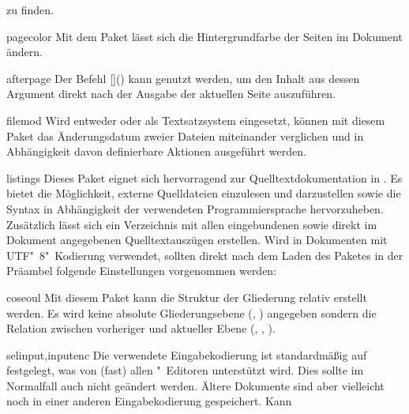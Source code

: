 \begin{packages}
  zu finden.
\item[pagecolor]
  Mit dem Paket lässt sich die Hintergrundfarbe der Seiten im Dokument ändern.
\item[afterpage]
  Der Befehl [\MPValue{\dots}]() kann 
  genutzt werden, um den Inhalt aus dessen Argument direkt nach der Ausgabe der 
  aktuellen Seite auszuführen.
\item[filemod]
  Wird entweder  oder  als Textsatzsystem 
  eingesetzt, können mit diesem Paket das Änderungsdatum zweier Dateien 
  miteinander verglichen und in Abhängigkeit davon definierbare Aktionen 
  ausgeführt werden.
\item[listings]
  Dieses Paket eignet sich hervorragend zur Quelltextdokumentation in 
  . Es bietet die Möglichkeit, externe Quelldateien einzulesen 
  und darzustellen sowie die Syntax in Abhängigkeit der verwendeten 
  Programmiersprache hervorzuheben. Zusätzlich lässt sich ein Verzeichnis mit 
  allen eingebundenen sowie direkt im Dokument angegebenen Quelltextauszügen 
  erstellen. Wird  in Dokumenten mit UTF"~8"~Kodierung 
  verwendet, sollten direkt nach dem Laden des Paketes in der Präambel folgende 
  Einstellungen vorgenommen werden:
  \begin{Code}
  \end{Code}\vspace{-\baselineskip}%
\item[coseoul]
  Mit diesem Paket kann die Struktur der Gliederung relativ erstellt werden. Es
  wird keine absolute Gliederungsebene (, ) 
  angegeben sondern die Relation zwischen vorheriger und aktueller Ebene 
  (, , ).
\item[selinput,inputenc]
  Die verwendete Eingabekodierung ist standardmäßig auf 
  festgelegt, was von (fast) allen "~Editoren unterstützt wird. 
  Dies sollte im Normalfall auch nicht geändert werden. Ältere Dokumente sind 
  aber vielleicht noch in einer anderen Eingabekodierung gespeichert. Kann 

\end{packages}
